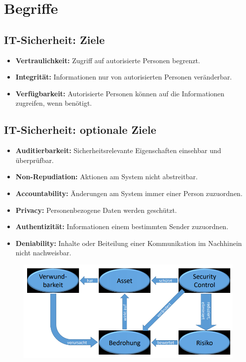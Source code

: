 
\chapter{Begriffe}
\section{IT-Sicherheit: Ziele}
\begin{itemize}
	\item \textbf{Vertraulichkeit:} Zugriff auf autorisierte Personen begrenzt.
	\item \textbf{Integrität:} Informationen nur von autorisierten Personen veränderbar.
	\item \textbf{Verfügbarkeit:} Autorisierte Personen können auf die Informationen zugreifen, wenn benötigt.
\end{itemize}

\section{IT-Sicherheit: optionale Ziele}
\begin{itemize}
	\item \textbf{Auditierbarkeit:} Sicherheitsrelevante Eigenschaften einsehbar und überprüfbar.
	\item \textbf{Non-Repudiation:} Aktionen am System nicht abstreitbar.
	\item \textbf{Accountability:} Änderungen am System immer einer Person zuzuordnen.
	\item \textbf{Privacy:} Personenbezogene Daten werden geschützt.
	\item \textbf{Authentizität:} Informationen einem bestimmten Sender zuzuordnen.
	\item \textbf{Deniability:} Inhalte oder Beiteilung einer Kommunikation im Nachhinein nicht nachweisbar.
\end{itemize}
\begin{figure}[H]
	\begin{center}
		\includegraphics[scale=0.5]{Resources/Grundbegriffe.png}
		\caption{}
		\label{fig:Grundbegriffe}
	\end{center}
\end{figure}

